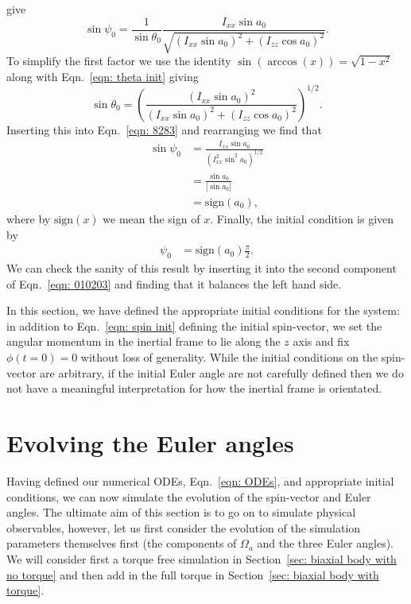 \documentclass[../full_thesis/full_thesis.tex]{subfiles}
\begin{document}
give
\begin{equation}
\sin\psi_{0} =\frac{1}{ \sin\theta_{0}}
\frac{ I_{xx}\sin a_{0}}{\sqrt{(I_{xx}\sin a_{0})^{2} + (I_{zz}\cos a_{0})^{2}}}.
\label{eqn: 8283}
\end{equation}
To simplify the first factor we use the identity $\sin(\arccos(x)) = \sqrt{1 - x^{2}}$
along with Eqn.~\eqref{eqn:  theta init} giving
\begin{equation}
\sin\theta_{0} = \left(\frac{(I_{xx}\sin a_{0})^{2}}
                  {(I_{xx}\sin a_{0})^{2} + (I_{zz}\cos a_{0})^{2}} \right)^{1/2}.
\end{equation}
Inserting this into Eqn.~\eqref{eqn: 8283} and rearranging we find that
\begin{align}
\sin \psi_0 & = \frac{I_{xx} \sin a_{0}}{\left(I_{xx}^{2} \sin^{2} a_{0}\right)^{1/2}} \\
 & = \frac{\sin a_{0} }{|\sin a_{0}|} \\
& = \mathrm{sign}(a_{0}),
\end{align}
where by $\mathrm{sign}(x)$ we mean the sign of $x$. Finally, the initial
condition is given by
\begin{align}
\psi_{0} & =\mathrm{sign}(a_{0}) \frac{\pi}{2}.
\label{eqn: psi  init}
\end{align}
We can check the sanity of this result by inserting it into the second component of
Eqn.~\eqref{eqn: 010203} and finding that it balances the left hand side.

In this section, we have defined the appropriate initial conditions for the
system: in addition to Eqn.~\eqref{eqn: spin init} defining the initial spin-vector,
we set the angular momentum in the inertial frame to lie along the
$z$ axis and fix $\phi(t=0)=0$ without loss of generality.  While the
initial conditions on the spin-vector are arbitrary, if the initial Euler angle
are not carefully defined then we do not have a meaningful interpretation for
how the inertial frame is orientated.

\section{Evolving the Euler angles}
\label{sec: evolving the euler angles}

Having defined our numerical ODEs, Eqn.~\eqref{eqn: ODEs}, and appropriate
initial conditions, we can now simulate the evolution of the spin-vector and
Euler angles. The ultimate aim of this section is to go on to simulate physical
observables, however, let us first consider the evolution of the simulation
parameters themselves first (the components of $\Omega_a$ and the three Euler
angles). We will consider first a torque free simulation in Section~\ref{sec:
biaxial body with no torque} and then add in the full torque in Section~\ref{sec:
biaxial body with torque}.
\end{document}
